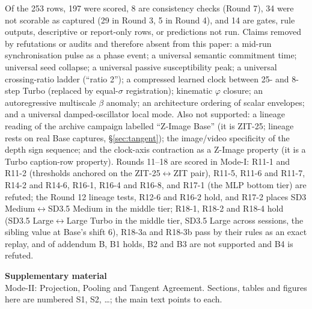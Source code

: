 \documentclass[11pt]{article}
\theoremstyle{definition}
\newcommand{\TT}{ZIT-25}%
\begin{document}
Of the 253 rows, 197 were scored, 8 are consistency checks (Round 7), 34 were not scorable as captured (29 in Round 3, 5 in Round 4), and 14 are gates, rule outputs, descriptive or report-only rows, or predictions not run. Claims removed by refutations or audits and therefore absent from this paper: a mid-run synchronisation pulse as a phase event; a universal semantic commitment time; universal seed collapse; a universal passive susceptibility peak; a universal crossing-ratio ladder (``ratio 2''); a compressed learned clock between 25- and 8-step Turbo (replaced by equal-$\sigma$ registration); kinematic $\varphi$ closure; an autoregressive multiscale $\beta$ anomaly; an architecture ordering of scalar envelopes; and a universal damped-oscillator local mode. Also not supported: a lineage reading of the archive campaign labelled ``Z-Image Base'' (it is \TT{}; lineage rests on real Base captures, \S\ref{sec:tangent}); the image/video specificity of the depth sign sequence; and the clock-axis contraction as a Z-Image property (it is a Turbo caption-row property). Rounds 11--18 are scored in Mode-I: R11-1 and R11-2 (thresholds anchored on the \TT{}$\leftrightarrow$ZIT pair), R11-5, R11-6 and R11-7, R14-2 and R14-6, R16-1, R16-4 and R16-8, and R17-1 (the MLP bottom tier) are refuted; the Round 12 lineage tests, R12-6 and R16-2 hold, and R17-2 places SD3 Medium$\leftrightarrow$SD3.5 Medium in the middle tier; R18-1, R18-2 and R18-4 hold (SD3.5 Large$\leftrightarrow$Large Turbo in the middle tier, SD3.5 Large across sessions, the sibling value at Base's shift 6), R18-3a and R18-3b pass by their rules as an exact replay, and of addendum B, B1 holds, B2 and B3 are not supported and B4 is refuted.


\clearpage
\setcounter{section}{0}\setcounter{table}{0}\setcounter{figure}{0}
\renewcommand{\thesection}{S\arabic{section}}\renewcommand{\thetable}{S\arabic{table}}\renewcommand{\thefigure}{S\arabic{figure}}
\renewcommand{\theHsection}{S\arabic{section}}\renewcommand{\theHtable}{S\arabic{table}}\renewcommand{\theHfigure}{S\arabic{figure}}
\begin{center}{\Large\bfseries Supplementary material}\\[4pt]\small Mode-II: Projection, Pooling and Tangent Agreement. Sections, tables and figures here are numbered S1, S2, \ldots; the main text points to each.\end{center}

\end{document}
